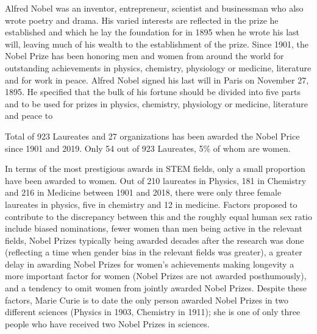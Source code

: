 \noindent
{}
\clearpage

\par
Alfred Nobel was an inventor, entrepreneur, scientist and businessman who also wrote poetry and drama. His varied interests are reflected 
in the prize he established and which he lay the foundation for in 1895 when he wrote his last will, leaving much of his wealth to the 
establishment of the prize. Since 1901, the Nobel Prize has been honoring men and women from around the world for outstanding achievements 
in physics, chemistry, physiology or medicine, literature and for work in peace. Alfred Nobel signed his last will in Paris on November 27, 1895. 
He specified that the bulk of his fortune should be divided into five parts and to be used for prizes in physics, chemistry, physiology or medicine, 
literature and peace to \cite{alfrednoble}

\par
Total of 923 Laureates and 27 organizations has been awarded the Nobel Price since 1901 and 2019. Only 54 out of 923 Laureates, 5\% of whom
are women.\cite{alfrednoble}

\par
In terms of the most prestigious awards in STEM fields, only a small proportion have been awarded to women. Out of 210 laureates in 
Physics, 181 in Chemistry and 216 in Medicine between 1901 and 2018, there were only three female laureates in physics, five in 
chemistry and 12 in medicine. Factors proposed to contribute to the discrepancy between this and the roughly equal human sex ratio 
include biased nominations, fewer women than men being active in the relevant fields, Nobel Prizes typically being awarded decades 
after the research was done (reflecting a time when gender bias in the relevant fields was greater), a greater delay in awarding 
Nobel Prizes for women's achievements making longevity a more important factor for women (Nobel Prizes are not awarded posthumously), 
and a tendency to omit women from jointly awarded Nobel Prizes. Despite these factors, Marie Curie is to date the only person awarded 
Nobel Prizes in two different sciences (Physics in 1903, Chemistry in 1911); she is one of only three people who have received two 
Nobel Prizes in sciences. 

